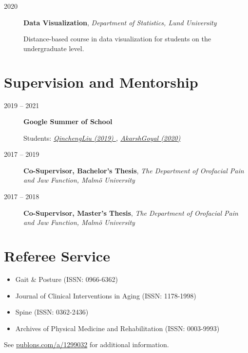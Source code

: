 \documentclass[
  10pt,
  headsepline=true,
  english,
  DIV=12
]{scrartcl}
\renewcommand*{%
  \mkbibnamegiven
}[1]{\ifitemannotation{highlight}{\textbf{#1}}{#1}}
\renewcommand*{%
  \mkbibnamefamily
}[1]{\ifitemannotation{highlight}{\textbf{#1}}{#1}}
\begin{document}
\begin{description}
  \item[2020]{
        \textbf{Data Visualization}, \emph{Department of Statistics, Lund
          University}

        Distance-based course in data visualization for students on
        the undergraduate level.
        }
\end{description}

\section{Supervision and Mentorship}

\begin{description}
  \item[2019 -- 2021]{
        \textbf{Google Summer of School}

        Students:
        \emph{
          \href{
            https://summerofcode.withgoogle.com/archive/2019/projects/4654960430546944/
          }{
            QinchengLiu (2019)
          },
          \href{
            https://summerofcode.withgoogle.com/dashboard/project/5459519376719872/overview
          }{
            AkarshGoyal (2020)
          }
        } }
  \item[2017 -- 2019] {
        \textbf{Co-Supervisor, Bachelor's Thesis}, \emph{The Department of
          Orofacial Pain and Jaw Function, Malmö University}

        }
  \item[2017 -- 2018] {
        \textbf{Co-Supervisor, Master's Thesis}, \emph{The Department of
          Orofacial Pain and Jaw Function, Malmö University}

        }
\end{description}

\section{Referee Service}

\begin{itemize}
  \item Gait \& Posture (ISSN: 0966-6362)
  \item Journal of Clinical Interventions in Aging (ISSN: 1178-1998)
  \item Spine (ISSN: 0362-2436)
  \item Archives of Physical Medicine and Rehabilitation (ISSN: 0003-9993)
\end{itemize}
See \href{http://publons.com/a/1299032}{publons.com/a/1299032} for
additional information.
\end{document}
